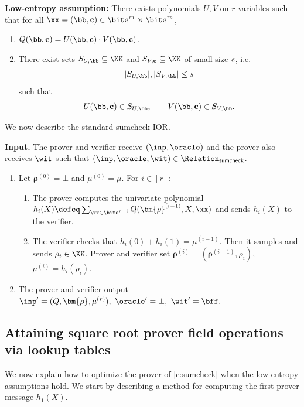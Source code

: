 \bigskip \noindent \textbf{Low-entropy assumption:}  There exists polynomials $U,V$ on $r$ variables %
such that for all $\xx=(\bb,\cc)\in \bits^{r_1}\times \bits^{r_2}$, 
%
\begin{enumerate}
\item $Q(\bb,\cc) = U(\bb,\cc) \cdot V(\bb,\cc)$.
\item There exist  sets  $S_{U,\bb}\subseteq \KK$ and $S_{V,\cc}\subseteq \KK$ of small size $s$, i.e.
%
$$
|S_{U,\bb}|, |S_{V,\bb}|\leq s
$$
such that 
$$U(\bb,\cc) \in S_{U,\bb},\qquad V(\bb,\cc) \in S_{V,\bb}.$$
\end{enumerate}



We now describe the standard sumcheck IOR.  
\begin{construction}\label{c:sumcheck}
\textbf{Input.} The prover and verifier receive $(\inp, \oracle)$ and the prover also receives $\wit$ such that  $(\inp, \oracle, \wit) \in \Relation_{\mathsf{sumcheck}}$.


%
\begin{enumerate}[leftmargin=*]
    \item Let $\bm{\rho}^{(0)}=\bot$ and $\mu^{(0)}=\mu$. 
    For $i\in [r]$:
\begin{enumerate}[leftmargin=*]
    \item The prover computes the univariate polynomial 
    $
    h_i(X) \defeq \sum_{\xx\in \bits^{r-i}} Q(\bm{\rho}^{(i-1)}, X, \xx) 
    $
    and sends $h_i(X)$ to the verifier.
    \item The verifier checks that $h_i(0) + h_i(1)=\mu^{(i-1)}$. Then it samples and sends $\rho_i \in \KK$. Prover and verifier set $\bm{\rho}^{(i)} = (\bm{\rho}^{(i-1)}, \rho_i)$,  $\mu^{(i)}=h_i(\rho_i)$.
\end{enumerate}
\item The prover and verifier output
$\inp'=(Q, \bm{\rho}, \mu^{(r)}), \ \oracle'=\bot,\ \wit' = \bff.$
\end{enumerate}
\end{construction}

\subsection{Attaining square root prover field operations via lookup tables}
We now explain how to optimize the prover of \cref{c:sumcheck} when the low-entropy assumptions hold. We start by describing a method for computing the first prover message $h_1(X)$. %


